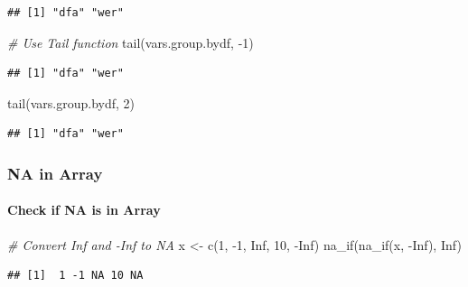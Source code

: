 \documentclass[
]{book}
\newenvironment{Shaded}{\begin{snugshade}}{\end{snugshade}}
\newcommand{\CommentTok}[1]{\textcolor[rgb]{0.56,0.35,0.01}{\textit{#1}}}
\newcommand{\ConstantTok}[1]{\textcolor[rgb]{0.00,0.00,0.00}{#1}}
\newcommand{\DecValTok}[1]{\textcolor[rgb]{0.00,0.00,0.81}{#1}}
\newcommand{\FunctionTok}[1]{\textcolor[rgb]{0.00,0.00,0.00}{#1}}
\newcommand{\NormalTok}[1]{#1}
\newcommand{\OtherTok}[1]{\textcolor[rgb]{0.56,0.35,0.01}{#1}}
\newcommand{\SpecialCharTok}[1]{\textcolor[rgb]{0.00,0.00,0.00}{#1}}
\begin{document}
\begin{verbatim}
## [1] "dfa" "wer"
\end{verbatim}

\begin{Shaded}
\begin{Highlighting}[]
\CommentTok{\# Use Tail function}
\FunctionTok{tail}\NormalTok{(vars.group.bydf, }\SpecialCharTok{{-}}\DecValTok{1}\NormalTok{)}
\end{Highlighting}
\end{Shaded}

\begin{verbatim}
## [1] "dfa" "wer"
\end{verbatim}

\begin{Shaded}
\begin{Highlighting}[]
\FunctionTok{tail}\NormalTok{(vars.group.bydf, }\DecValTok{2}\NormalTok{)}
\end{Highlighting}
\end{Shaded}

\begin{verbatim}
## [1] "dfa" "wer"
\end{verbatim}

\hypertarget{na-in-array}{%
\subsubsection{NA in Array}\label{na-in-array}}

\hypertarget{check-if-na-is-in-array}{%
\paragraph{Check if NA is in Array}\label{check-if-na-is-in-array}}

\begin{Shaded}
\begin{Highlighting}[]
\CommentTok{\# Convert Inf and {-}Inf to NA}
\NormalTok{x }\OtherTok{\textless{}{-}} \FunctionTok{c}\NormalTok{(}\DecValTok{1}\NormalTok{, }\SpecialCharTok{{-}}\DecValTok{1}\NormalTok{, }\ConstantTok{Inf}\NormalTok{, }\DecValTok{10}\NormalTok{, }\SpecialCharTok{{-}}\ConstantTok{Inf}\NormalTok{)}
\FunctionTok{na\_if}\NormalTok{(}\FunctionTok{na\_if}\NormalTok{(x, }\SpecialCharTok{{-}}\ConstantTok{Inf}\NormalTok{), }\ConstantTok{Inf}\NormalTok{)}
\end{Highlighting}
\end{Shaded}

\begin{verbatim}
## [1]  1 -1 NA 10 NA
\end{verbatim}
\end{document}
